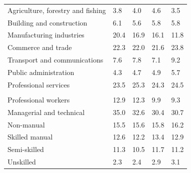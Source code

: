 \documentclass{article}
\begin{document}
\begin{table}[h]
\begin{tabular}{KTTTT}
    \hline
Agriculture, forestry and fishing  & 3.8& 4.0& 4.6& 3.5\\
Building and construction & 6.1& 5.6& 5.8& 5.8\\
Manufacturing industries & 20.4& 16.9& 16.1& 11.8\\
Commerce and trade  & 22.3& 22.0& 21.6& 23.8\\
Transport and communications  & 7.6& 7.8& 7.1& 9.2\\
Public administration & 4.3& 4.7& 4.9& 5.7\\
Professional services & 23.5& 25.3& 24.3& 24.5\\
\hline
    \\ 
    \hline
Professional workers  & 12.9& 12.3 &  9.9&  9.3\\
Managerial and technical & 35.0& 32.6& 30.4& 30.7\\
Non-manual & 15.5& 15.6& 15.8& 16.2\\
Skilled manual & 12.6& 12.2& 13.4& 12.9\\
Semi-skilled & 11.3& 10.5& 11.7& 11.2\\
Unskilled  & 2.3& 2.4& 2.9& 3.1\\
\end{tabular}
\end{table}
\pagebreak
\end{document}

